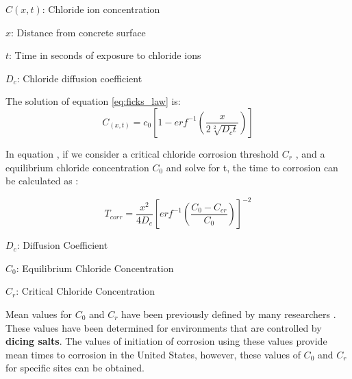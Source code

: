 $C(x,t)$: Chloride ion concentration

$x$: Distance from concrete surface

$t$: Time in seconds of exposure to chloride ions

$D_c$: Chloride diffusion coefficient

The solution of equation \ref{eq:ficks_law} is:
\begin{equation}
  C_(x,t)=c_{0} \left[1-erf^{-1}\left(\frac{x}{2\sqrt[2]{D_c t}}\right)\right]
  \label{eq:two}
\end{equation} 

In equation , if we consider a critical chloride corrosion threshold $C_r$ , and a equilibrium chloride concentration $C_0$ and solve for t, the time to corrosion can be calculated as \cite{Ghosh2010}: 

\begin{equation}
  T_{corr}=\frac{x^2}{4 D_c} \left[erf^{-1} \left(\frac{C_0-C_{cr}}{C_0} \right) \right]^{-2}
  \label{eq.three}
\end{equation} 

$D_c$: Diffusion Coefficient

$C_0$: Equilibrium Chloride Concentration
 
$C_r$: Critical Chloride Concentration
\newline 

Mean values for $C_0$ and $C_r$ have been previously defined by many researchers \cite{Ghosh2010}\cite{Weyers1994}\cite{Enright1998}. These values have been determined for environments that are controlled by \textbf{dicing salts}. The values of initiation of corrosion using these values provide mean times to corrosion in the United States, however, these values of $C_0$ and $C_r$ for specific sites can be obtained.

